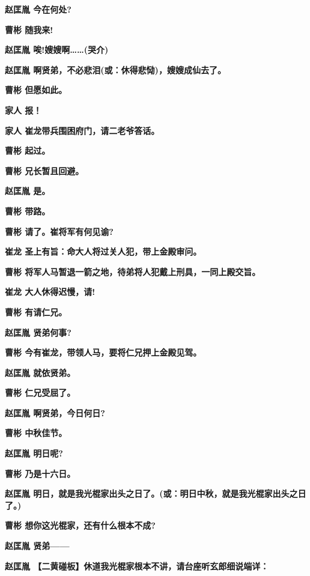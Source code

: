 \textbf{赵匡胤 今在何处?}

\textbf{曹彬 随我来!}

\textbf{赵匡胤 唉!嫂嫂啊\ldots{}\ldots{}(哭介)}

\textbf{赵匡胤 啊贤弟，不必悲泪(或：休得悲恸)，嫂嫂成仙去了。}

\textbf{曹彬 但愿如此。}

\textbf{家人 报！}

\textbf{家人 崔龙带兵围困府门，请二老爷答话。}

\textbf{曹彬 起过。}

\textbf{曹彬 兄长暂且回避。}

\textbf{赵匡胤 是。}

\textbf{曹彬 带路。}

\textbf{曹彬 请了。崔将军有何见谕?}

\textbf{崔龙 圣上有旨：命大人将过关人犯，带上金殿审问。}

\textbf{曹彬 将军人马暂退一箭之地，待弟将人犯戴上刑具，一同上殿交旨。}

\textbf{崔龙 大人休得迟慢，请!}

\textbf{曹彬 有请仁兄。}

\textbf{赵匡胤 贤弟何事?}

\textbf{曹彬 今有崔龙，带领人马，要将仁兄押上金殿见驾。}

\textbf{赵匡胤 就依贤弟。}

\textbf{曹彬 仁兄受屈了。}

\textbf{赵匡胤 啊贤弟，今日何日?}

\textbf{曹彬 中秋佳节。}

\textbf{赵匡胤 明日呢?}

\textbf{曹彬 乃是十六日。}

\textbf{赵匡胤
明日，就是我光棍家出头之日了。(或：明日中秋，就是我光棍家出头之日了。)}

\textbf{曹彬 想你这光棍家，还有什么根本不成?}

\textbf{赵匡胤 贤弟------}

\textbf{赵匡胤 【二黄碰板】休道我光棍家根本不讲，请台座听玄郎细说端详：}

